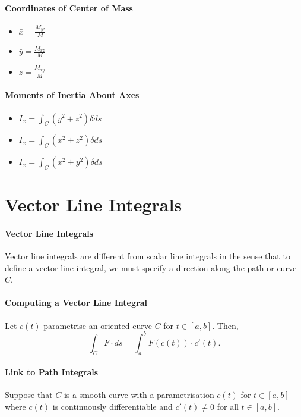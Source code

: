 \paragraph{Coordinates of Center of Mass}  
\begin{itemize}
    \item \(\bar{x} = \frac{M_{yz}}{M}\)
    \item \(\bar{y} = \frac{M_{xz}}{M}\)
    \item \(\bar{z} = \frac{M_{xy}}{M}\)
\end{itemize}

\paragraph{Moments of Inertia About Axes}
\begin{itemize}
    \item \(I_x = \int_C (y^2 + z^2) \delta ds\)
    \item \(I_x = \int_C (x^2 + z^2) \delta ds\)
    \item \(I_x = \int_C (x^2 + y^2) \delta ds\)
\end{itemize}


\section{Vector Line Integrals}
\paragraph{Vector Line Integrals}  
Vector line integrals are different from scalar line integrals in the
sense that to define a vector line integral, we must specify a direction
along the path or curve \(C\).

\paragraph{Computing a Vector Line Integral}
Let \(c(t)\) parametrise an oriented curve \(C\) for \(t\in [a, b]\).
Then, 
\[
    \int_C F\cdot ds = \int_a^b F(c(t)) \cdot c'(t).
\]

\paragraph{Link to Path Integrals}
Suppose that \(C\) is a smooth curve with a parametrisation \(c(t)\)
for \(t\in[a, b]\) where \(c(t)\) is continuously differentiable and
\(c'(t) \neq 0\) for all \(t\in [a, b]\).

